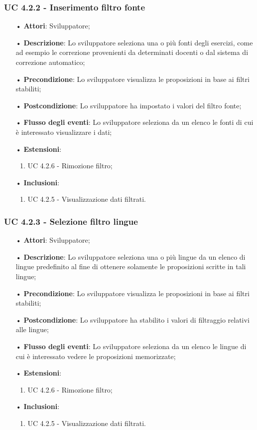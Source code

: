 \subsubsection{UC 4.2.2 - Inserimento filtro fonte}
\begin{itemize}
\item[•]\textbf{Attori}: Sviluppatore;
\item[•]\textbf{Descrizione}: Lo sviluppatore seleziona una o più fonti degli esercizi, come ad esempio le correzione provenienti da determinati docenti o dal sistema di correzione automatico;
\item[•]\textbf{Precondizione}: Lo sviluppatore visualizza le proposizioni in base ai filtri stabiliti;
\item[•]\textbf{Postcondizione}: Lo sviluppatore ha impostato i valori del filtro fonte;
\item[•]\textbf{Flusso degli eventi}: Lo sviluppatore seleziona da un elenco le fonti di cui è interessato visualizzare i dati;
\item[•]\textbf{Estensioni}: 
\begin{enumerate}
	\item UC 4.2.6 - Rimozione filtro;
\end{enumerate}
\item[•]\textbf{Inclusioni}:
\begin{enumerate}
\item UC 4.2.5 - Visualizzazione dati filtrati.
\end{enumerate}
\end{itemize}

\subsubsection{UC 4.2.3 -  Selezione filtro lingue}
\begin{itemize}
\item[•]\textbf{Attori}: Sviluppatore;
\item[•]\textbf{Descrizione}: Lo sviluppatore seleziona una o più lingue da un elenco di lingue predefinito al fine di ottenere solamente le proposizioni scritte in tali lingue;
\item[•]\textbf{Precondizione}: Lo sviluppatore visualizza le proposizioni in base ai filtri stabiliti;
\item[•]\textbf{Postcondizione}: Lo sviluppatore ha stabilito i valori di filtraggio relativi alle lingue;
\item[•]\textbf{Flusso degli eventi}: Lo sviluppatore seleziona da un elenco le lingue di cui è interessato vedere le proposizioni memorizzate;
\item[•]\textbf{Estensioni}: 
\begin{enumerate}
	\item UC 4.2.6 - Rimozione filtro;
\end{enumerate}
\item[•]\textbf{Inclusioni}:
\begin{enumerate}
\item UC 4.2.5 - Visualizzazione dati filtrati.
\end{enumerate}
\end{itemize}

